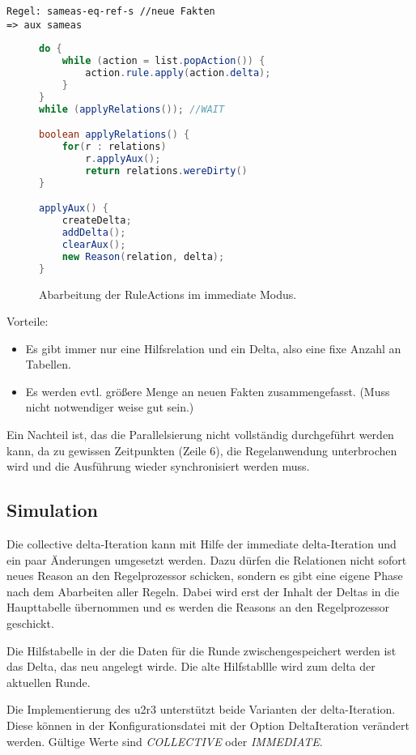 \begin{verbatim}
Regel: sameas-eq-ref-s //neue Fakten
=> aux sameas
\end{verbatim}

\begin{figure}[htp]
	\caption{Abarbeitung der RuleActions im immediate Modus.}
	\label{code-immediate-delta-iteration}
	\begin{lstlisting}[language=Java]
do {
	while (action = list.popAction()) {
		action.rule.apply(action.delta);
	}
}
while (applyRelations()); //WAIT

boolean applyRelations() {
	for(r : relations)
		r.applyAux();
		return relations.wereDirty()
}

applyAux() {
	createDelta;
	addDelta();
	clearAux();
	new Reason(relation, delta);
}
	\end{lstlisting}
\end{figure}

Vorteile:
\begin{itemize}
  \item Es gibt immer nur eine Hilfsrelation und ein Delta, also eine fixe Anzahl an Tabellen.
  \item Es werden evtl. größere Menge an neuen Fakten zusammengefasst. (Muss nicht notwendiger weise gut sein.)
\end{itemize}

Ein Nachteil ist, das die Parallelsierung nicht vollständig durchgeführt werden kann, da zu gewissen Zeitpunkten (Zeile 6), die Regelanwendung unterbrochen wird und die Ausführung wieder synchronisiert werden muss.

\subsection{Simulation}

Die collective delta-Iteration kann mit Hilfe der immediate delta-Iteration und ein paar Änderungen umgesetzt werden. Dazu dürfen die Relationen nicht sofort neues Reason an den Regelprozessor schicken, sondern es gibt eine eigene Phase nach dem Abarbeiten aller Regeln. Dabei wird erst der Inhalt der Deltas in die Haupttabelle übernommen und es werden die Reasons an den Regelprozessor geschickt.

Die Hilfstabelle in der die Daten für die Runde zwischengespeichert werden ist das Delta, das neu angelegt wirde. Die alte Hilfstabllle wird zum delta der aktuellen Runde.

Die Implementierung des u2r3 unterstützt beide Varianten der delta-Iteration. Diese können in der Konfigurationsdatei mit der Option DeltaIteration verändert werden. Gültige Werte sind \emph{COLLECTIVE} oder \emph{IMMEDIATE}.
